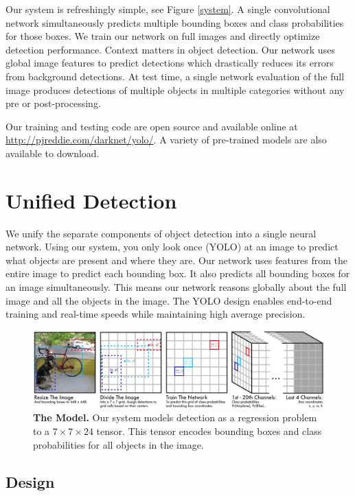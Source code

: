 \documentclass{article} %
\begin{document}
Our system is refreshingly simple, see Figure \ref{system}. A single convolutional network simultaneously predicts multiple bounding boxes and class probabilities for those boxes. We train our network on full images and directly optimize detection performance. Context matters in object detection. Our network uses global image features to predict detections which drastically reduces its errors from background detections. At test time, a single network evaluation of the full image produces detections of multiple objects in multiple categories without any pre or post-processing.

Our training and testing code are open source and available online at \url{http://pjreddie.com/darknet/yolo/}. A variety of pre-trained models are also available to download.

\section{Unified Detection}

We unify the separate components of object detection into a single neural network. Using our system, you only look once (YOLO) at an image to predict what objects are present and where they are. Our network uses features from the entire image to predict each bounding box. It also predicts all bounding boxes for an image simultaneously. This means our network reasons globally about the full image and all the objects in the image. The YOLO design enables end-to-end training and real-time speeds while maintaining high average precision.

\begin{figure}[h]
\begin{center}
        \includegraphics[width=\linewidth]{full}
\end{center}
   \caption{\textbf{The Model.} Our system models detection as a regression problem to a $7 \times 7 \times 24$ tensor. This tensor encodes bounding boxes and class probabilities for all objects in the image.}
\label{model}
\end{figure}
\subsection{Design}
\end{document}
